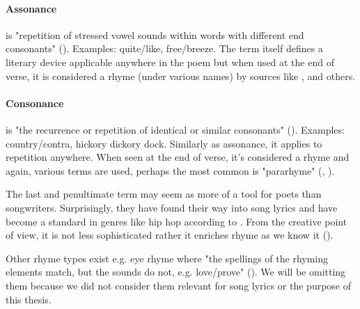 \paragraph{Assonance} is "repetition of stressed vowel sounds within words with different end consonants" (\cite{britannica}). Examples:	quite/like, free/breeze. The term itself defines a literary device applicable anywhere in the poem but when used at the end of verse, it is considered a rhyme (under various names) by sources like \cite{vanphonological}, \cite{bergman2017litcharts} and others.

\paragraph{Consonance} is "the recurrence or repetition of identical or similar consonants" (\cite{britannica}). Examples: country/contra, hickory dickory dock. Similarly as assonance, it applies to repetition anywhere. When seen at the end of verse, it's considered a rhyme and again, various terms are used, perhaps the most common is "pararhyme" (\cite{britannica}, \cite{oxforddict2008literary}).\newline


The last and penultimate term may seem as more of a tool for poets than songwriters. Surprisingly, they have found their way into song lyrics and have become a standard in genres like hip hop according to \cite{vanphonological}. From the creative point of view, it is not less sophisticated rather it enriches rhyme as we know it (\cite{brogan2016poeticterms}).

Other rhyme types exist e.g. eye rhyme where "the spellings of the rhyming elements match, but the sounds do not, e.g. love/prove" (\cite{oxforddict2008literary}). We will be omitting them because we did not consider them relevant for song lyrics or the purpose of this thesis.




